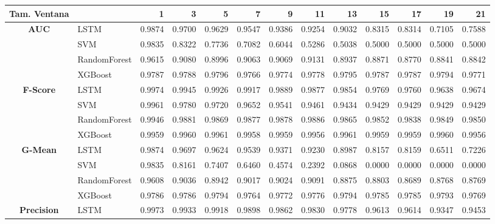 \begin{table}[h]
	\centering
	\begin{adjustbox}{max width=15cm}
		\begin{tabular}{|c|l|r|r|r|r|r|r|r|r|r|r|r|}
			\hline
			\textbf{Tam. Ventana}&         &      1  &      3  &      5  &      7  &      9  &      11 &      13 &      15 &      17 &      19 &      21 \\
			\hline
			\textbf{AUC} & LSTM &  0.9874 &  0.9700 &  0.9629 &  0.9547 &  0.9386 &  0.9254 &  0.9032 &  0.8315 &  0.8314 &  0.7105 &  0.7588 \\
			& SVM &  0.9835 &  0.8322 &  0.7736 &  0.7082 &  0.6044 &  0.5286 &  0.5038 &  0.5000 &  0.5000 &  0.5000 &  0.5000 \\
			& RandomForest &  0.9615 &  0.9080 &  0.8996 &  0.9063 &  0.9069 &  0.9131 &  0.8937 &  0.8871 &  0.8770 &  0.8841 &  0.8842 \\
			& XGBoost &  0.9787 &  0.9788 &  0.9796 &  0.9766 &  0.9774 &  0.9778 &  0.9795 &  0.9787 &  0.9787 &  0.9794 &  0.9771 \\
			\hline
			\textbf{F-Score} & LSTM &  0.9974 &  0.9945 &  0.9926 &  0.9917 &  0.9889 &  0.9877 &  0.9854 &  0.9769 &  0.9760 &  0.9638 &  0.9674 \\
			& SVM &  0.9961 &  0.9780 &  0.9720 &  0.9652 &  0.9541 &  0.9461 &  0.9434 &  0.9429 &  0.9429 &  0.9429 &  0.9429 \\
			& RandomForest &  0.9946 &  0.9881 &  0.9869 &  0.9877 &  0.9878 &  0.9886 &  0.9865 &  0.9852 &  0.9838 &  0.9849 &  0.9850 \\
			& XGBoost &  0.9959 &  0.9960 &  0.9961 &  0.9958 &  0.9959 &  0.9956 &  0.9961 &  0.9959 &  0.9959 &  0.9960 &  0.9956 \\
			\hline
			\textbf{G-Mean} & LSTM &  0.9874 &  0.9697 &  0.9624 &  0.9539 &  0.9371 &  0.9230 &  0.8987 &  0.8157 &  0.8159 &  0.6511 &  0.7226 \\
			& SVM &  0.9835 &  0.8161 &  0.7407 &  0.6460 &  0.4574 &  0.2392 &  0.0868 &  0.0000 &  0.0000 &  0.0000 &  0.0000 \\
			& RandomForest &  0.9608 &  0.9036 &  0.8942 &  0.9017 &  0.9024 &  0.9091 &  0.8875 &  0.8803 &  0.8689 &  0.8768 &  0.8769 \\
			& XGBoost &  0.9786 &  0.9786 &  0.9794 &  0.9764 &  0.9772 &  0.9776 &  0.9794 &  0.9785 &  0.9785 &  0.9793 &  0.9769 \\
			\hline
			\textbf{Precision} & LSTM &  0.9973 &  0.9933 &  0.9918 &  0.9898 &  0.9862 &  0.9830 &  0.9778 &  0.9613 &  0.9614 &  0.9347 &  0.9453 \\

\end{tabular}
\end{adjustbox}
\end{table}
